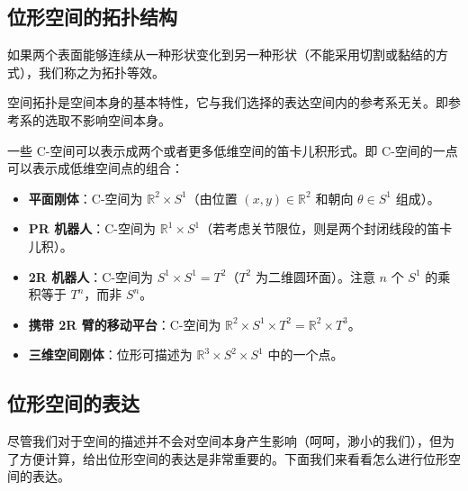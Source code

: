 \subsection{位形空间的拓扑结构}
\begin{tcolorbox}[colback=gray!5,colframe=black,title=拓扑等效]
    如果两个表面能够连续从一种形状变化到另一种形状（不能采用切割或黏结的方式），我们称之为拓扑等效。

\end{tcolorbox}


\begin{tcolorbox}[colback=red!5!white,colframe=red!75!black]
空间拓扑是空间本身的基本特性，它与我们选择的表达空间内的参考系无关。即参考系的选取不影响空间本身。
\end{tcolorbox}
\begin{tcolorbox}[colback=gray!5, colframe=black, title=C-空间的笛卡儿积（Cartesian Product）表示]
一些 C-空间可以表示成两个或者更多低维空间的笛卡儿积形式。即 C-空间的一点可以表示成低维空间点的组合：
\begin{itemize}
    \item \textbf{平面刚体}：C-空间为 $\mathbb{R}^2 \times S^1$（由位置 $(x, y) \in \mathbb{R}^2$ 和朝向 $\theta \in S^1$ 组成）。
    \item \textbf{PR 机器人}：C-空间为 $\mathbb{R}^1 \times S^1$（若考虑关节限位，则是两个封闭线段的笛卡儿积）。
    \item \textbf{2R 机器人}：C-空间为 $S^1 \times S^1 = T^2$（$T^2$ 为二维圆环面）。注意 $n$ 个 $S^1$ 的乘积等于 $T^n$，而非 $S^n$。
    \item \textbf{携带 2R 臂的移动平台}：C-空间为 $\mathbb{R}^2 \times S^1 \times T^2 = \mathbb{R}^2 \times T^3$。
    \item \textbf{三维空间刚体}：位形可描述为 $\mathbb{R}^3 \times S^2 \times S^1$ 中的一个点。
\end{itemize}
\end{tcolorbox}

\subsection{位形空间的表达}
尽管我们对于空间的描述并不会对空间本身产生影响（呵呵，渺小的我们），但为了方便计算，给出位形空间的表达是非常重要的。下面我们来看看怎么进行位形空间的表达。

